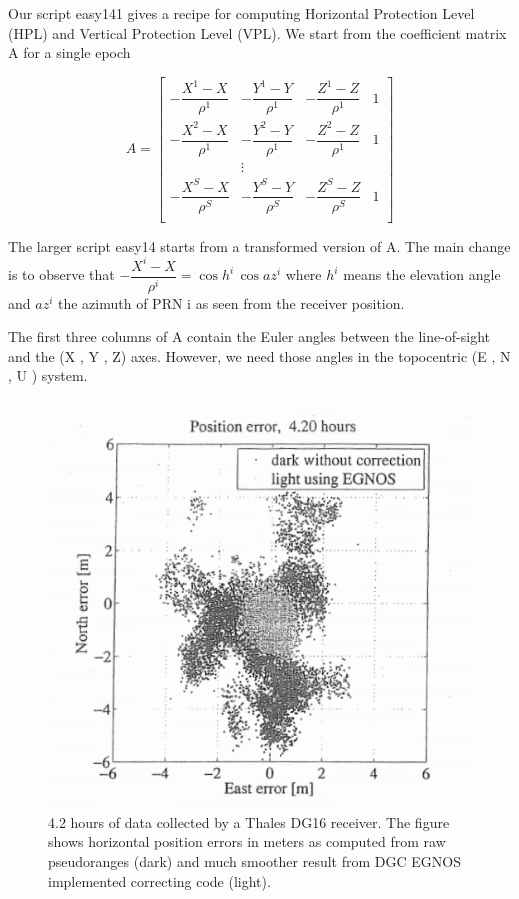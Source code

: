 		Our script easy141 gives a recipe for computing Horizontal Protection Level (HPL) and Vertical Protection Level (VPL). We start from the coefficient matrix A for a single epoch
		
		\begin{equation}\label{eq:9.71}
			A = \begin{bmatrix}
				-\dfrac{X^1-X}{\rho^1} & -\dfrac{Y^1-Y}{\rho^1} & -\dfrac{Z^1-Z}{\rho^1} & 1 \\
				-\dfrac{X^2-X}{\rho^1} & -\dfrac{Y^2-Y}{\rho^1} & -\dfrac{Z^2-Z}{\rho^1} & 1 \\
				& \vdots & & \\
				-\dfrac{X^S-X}{\rho^S} & -\dfrac{Y^S-Y}{\rho^S} & -\dfrac{Z^S-Z}{\rho^S} & 1 \\
			\end{bmatrix}
		\end{equation}
		
		The larger script easy14 starts from a transformed version of A. The main change is to observe that $-\dfrac{X^i-X}{\rho^i} = \cos h^i \, \cos az^i$ where $h^i$ means the elevation angle and $az^i$ the azimuth of PRN i as seen from the receiver position.

		The first three columns of A contain the Euler angles between the line-of-sight and the (X , Y , Z) axes. However, we need those angles in the topocentric (E , N , U ) system.
		\begin{figure}[h]
			\centering
			\includegraphics[width=0.7\linewidth]{TeX_files/Part03/chapter09/image/9-26}
			\caption{4.2 hours of data collected by a Thales DG16 receiver. The figure shows horizontal position errors in meters as computed from raw pseudoranges (dark) and much smoother result from DGC EGNOS implemented correcting code (light).}
			\label{fig:9-26}
		\end{figure}
		
